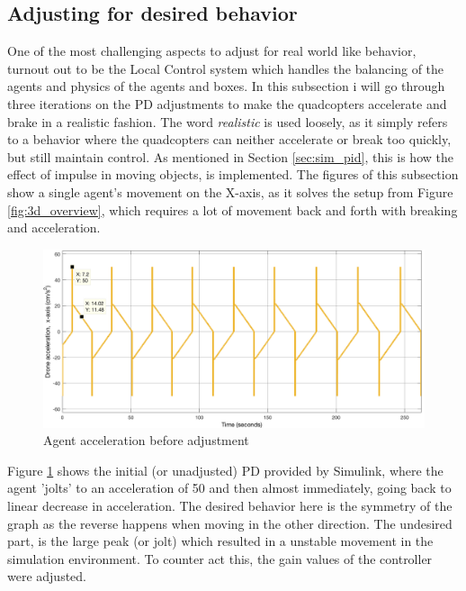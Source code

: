 \subsection{Adjusting for desired behavior}
\label{sec:tuning}
One of the most challenging aspects to adjust for real world like behavior, turnout out to be the Local Control system which handles the balancing of the agents and physics of the agents and boxes. In this subsection i will go through three iterations on the PD adjustments to make the quadcopters accelerate and brake in a realistic fashion. The word \textit{realistic} is used loosely, as it simply refers to a behavior where the quadcopters can neither accelerate or break too quickly, but still maintain control. As mentioned in Section \ref{sec:sim_pid}, this is how the effect of impulse in moving objects, is implemented. The figures of this subsection show a single agent's movement on the X-axis, as it solves the setup from Figure \ref{fig:3d_overview}, which requires a lot of movement back and forth with breaking and acceleration. 

\begin{figure}[H]
  \centering
  \includegraphics[width=1\columnwidth]{figures/SA_accel_pre_adjustment}
  \caption{\label{fig:pre_adjust}Agent acceleration before adjustment}
\end{figure}

Figure \ref{fig:pre_adjust} shows the initial (or unadjusted) PD provided by Simulink, where the agent 'jolts' to an acceleration of 50 and then almost immediately, going back to linear decrease in acceleration. The desired behavior here is the symmetry of the graph as the reverse happens when moving in the other direction. The undesired part, is the large peak (or jolt) which resulted in a unstable movement in the simulation environment. To counter act this, the gain values of the controller were adjusted.
 

